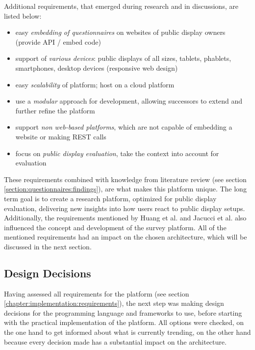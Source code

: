 	Additional requirements, that emerged during research and in discussions, are listed below:

	\begin{itemize}[itemsep=0pt] 
	\item easy \textit{embedding of questionnaires} on websites of public display owners (provide API / embed code)
	\item support of \textit{various devices}: public displays of all sizes, tablets, phablets, smartphones, desktop devices (responsive web design)
	\item easy \textit{scalability} of platform; host on a cloud platform
	\item use a \textit{modular} approach for development, allowing successors to extend and further refine the platform
	\item support \textit{non web-based platforms}, which are not capable of embedding a website or making REST calls
	\item focus on \textit{public display evaluation}, take the context into account for evaluation
	\end{itemize}


	These requirements combined with knowledge from literature review (see section \ref{section:questionnaires:findings}), are what makes this platform unique. The long term goal is to create a research platform, optimized for public display evaluation, delivering new insights into how users react to public display setups. Additionally, the requirements mentioned by Huang et al. \cite{huang2008overcoming} and Jacucci et al. \cite{jacucci2010worldsofinformation} also influenced the concept and development of the survey platform. All of the mentioned requirements had an impact on the chosen architecture, which will be discussed in the next section.



\subsection{Design Decisions}
\label{chapter:implementation:design-decisions}

	Having assessed all requirements for the platform (see section \ref{chapter:implementation:requirements}), the next step was making design decisions for the programming language and frameworks to use, before starting with the practical implementation of the platform. All options were checked, on the one hand to get informed about what is currently trending, on the other hand because every decision made has a substantial impact on the architecture.



